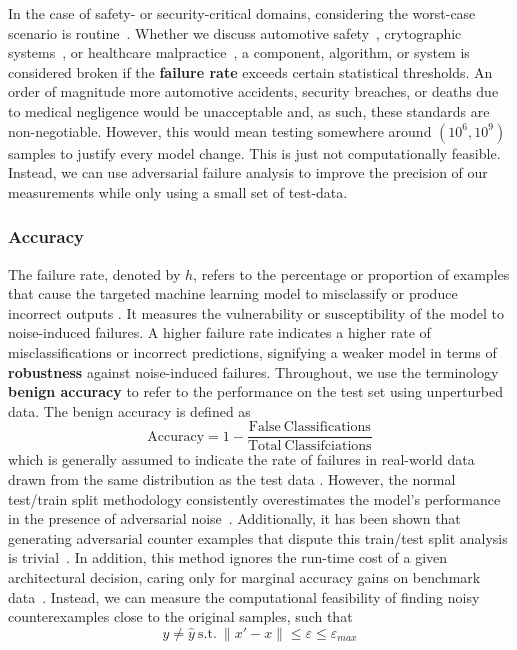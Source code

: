 \documentclass[conference]{IEEEtran}
\begin{document}
In the case of safety- or security-critical domains, considering the worst-case scenario is routine~\cite{}. Whether we discuss automotive safety~\cite{}, crytographic systems~\cite{}, or healthcare malpractice~\cite{}, a component, algorithm, or system is considered broken if the \textbf{failure rate} exceeds certain statistical thresholds. An order of magnitude more automotive accidents, security breaches, or deaths due to medical negligence would be unacceptable and, as such, these standards are non-negotiable. However, this would mean testing somewhere around $(10^6, 10^9)$ samples to justify every model change. This is just not computationally feasible. Instead, we can use adversarial failure analysis to improve the precision of our measurements while only using a small set of test-data.

\subsubsection{Accuracy}
The failure rate, denoted by $h$, refers to the percentage or proportion of examples that cause the targeted machine learning model to misclassify or produce incorrect outputs \cite{meyers}. It measures the vulnerability or susceptibility of the model to noise-induced failures. A higher failure rate indicates a higher rate of misclassifications or incorrect predictions, signifying a weaker model in terms of \textbf{robustness} against noise-induced failures. Throughout, we use the terminology \textbf{benign accuracy} to refer to the performance on the test set using unperturbed data. The benign accuracy is defined as
\begin{equation}
 \mathrm{Accuracy} = 1 - \frac{\mathrm{False~Classifications}}{\mathrm{Total~Classifciations}}
\label{eq:acc}
\end{equation}
which is generally assumed to indicate the rate of failures in real-world data drawn from the same distribution as the test data \cite{}. However, the normal test/train split methodology consistently overestimates the model's performance in the presence of adversarial noise~\cite{croce_reliable_2020}. Additionally, it has been shown that generating adversarial counter examples that dispute this train/test split analysis is trivial~\cite{biggio_evasion_2013,carlini_towards_2017,adversarialpatch,pixelattack,hopskipjump,biggio_poisoning_2013,chakraborty_adversarial_2018,dohmatob_generalized_2019,meyers}. In addition, this method ignores the run-time cost of a given architectural decision, caring only for marginal accuracy gains on benchmark data~\cite{}. Instead, we can measure the computational feasibility of finding noisy counterexamples close to the original samples, such that 
$$
y\neq\hat{y}\mathrm{~s.t.~}\| x' - x \| \leq \varepsilon \leq \varepsilon_{max}
$$ 
\end{document}

